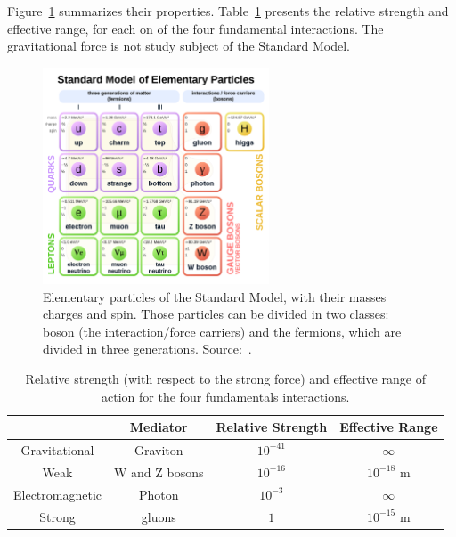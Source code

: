 Figure~\ref{sm_summary} summarizes their properties. Table~\ref{fundamental_forces} presents the relative strength and effective range, for each on of the four fundamental interactions. The gravitational force is not study subject of the Standard Model.

\begin{figure}[!htbp]
  \begin{center}
  \includegraphics[width=0.6\textwidth ]{figures_and_tables/theory/sm.png}
  \end{center}\vspace*{-.5cm}
  \caption{Elementary particles of the Standard Model, with their masses charges and spin. Those particles can be divided in two classes: boson (the interaction/force carriers) and the fermions, which are divided in three generations. Source:~\cite{fig_sm_summary}.}
  \label{sm_summary}
  \end{figure}
 

\begin{table}[htp]
  \begin{center}
      \caption{Relative strength (with respect to the strong force) and effective range of action for the four fundamentals interactions.}
    \begin{tabular}{ cccc }
       & Mediator & Relative Strength & Effective Range \\ \hline
      Gravitational & Graviton & $10^{-41}$ & $\infty$ \\ 
      Weak & W and Z bosons & $10^{-16}$ & $10^{-18}$ m \\ 
      Electromagnetic & Photon & $10^{-3}$ & $\infty$ \\ 
      Strong & gluons & $1$ & $10^{-15}$ m\\ \hline
      \end{tabular}
  \label{fundamental_forces}
  \end{center} 
  \end{table}



